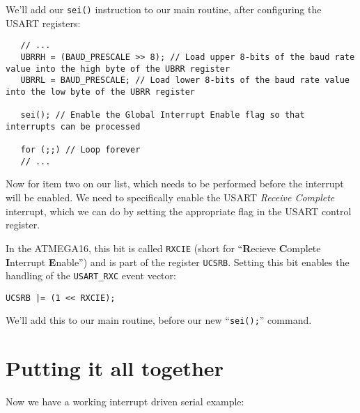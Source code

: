 \documentclass[a4paper,oneside]{book}
\begin{document}
We'll add our \texttt{sei()} instruction to our main routine, after configuring the USART registers:

\begin{center}
\begin{lstlisting}
   // ...
   UBRRH = (BAUD_PRESCALE >> 8); // Load upper 8-bits of the baud rate value into the high byte of the UBRR register
   UBRRL = BAUD_PRESCALE; // Load lower 8-bits of the baud rate value into the low byte of the UBRR register

   sei(); // Enable the Global Interrupt Enable flag so that interrupts can be processed

   for (;;) // Loop forever
   // ...
\end{lstlisting}
\end{center}

Now for item two on our list, which needs to be performed before the interrupt will be enabled. We need to specifically enable the USART \emph{Receive Complete} interrupt, which we can do by setting the appropriate flag in the USART control register.

In the ATMEGA16, this bit is called \texttt{RXCIE} (short for ``\textbf{R}ecieve \textbf{C}omplete \textbf{I}nterrupt \textbf{E}nable'') and is part of the register \texttt{UCSRB}. Setting this bit enables the handling of the \texttt{USART\_RXC} event vector:

\begin{center}
\begin{lstlisting}
UCSRB |= (1 << RXCIE);
\end{lstlisting}
\end{center}

We'll add this to our main routine, before our new ``\texttt{sei();}'' command.


\chapter{Putting it all together}

Now we have a working interrupt driven serial example:
\end{document}
